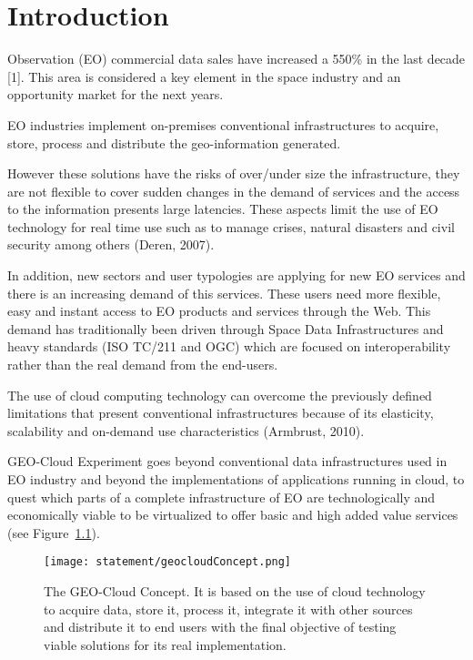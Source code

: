 \chapter{Introduction}

 Observation (\acs{EO}) commercial data sales have increased a 550\% in
the last decade \cite{sousa}[1]. This area is considered a key element in the
space industry and an opportunity market for the next years.

\ac{EO} industries implement on-premises conventional infrastructures to acquire,
store, process and distribute the geo-information generated.

However these solutions have the risks of over/under size the infrastructure, they are not flexible to cover sudden changes in the demand of services and the access to the information presents large latencies.  These aspects limit the use of \ac{EO} technology for real time use such as to manage crises, natural disasters and civil security among others (Deren, 2007).

In addition, new sectors and user typologies are applying for new \ac{EO} services
and there is an increasing demand of this services. These users
need more flexible, easy and instant access to \ac{EO} products and services through
the Web. This demand has traditionally been driven through Space Data
Infrastructures and heavy standards (\acs{ISO} TC/211 and \ac{OGC}) which are focused on
interoperability rather than the real demand from the end-users.

The use of cloud computing technology can overcome the previously defined limitations that present conventional infrastructures because of its elasticity, scalability and on-demand use characteristics (Armbrust, 2010).

GEO-Cloud Experiment goes beyond conventional data infrastructures used in \ac{EO}
industry and beyond the implementations of applications running in cloud, to
quest which parts of a complete infrastructure of \ac{EO} are technologically and
economically viable to be virtualized to offer basic and high added value
services (see Figure~\ref{fig:intr-geocloudConcept}).

\begin{figure}[!h]
\begin{center}
\texttt{[image: statement/geocloudConcept.png]}
\caption[The GEO-Cloud Concept.]{The GEO-Cloud Concept. It is based on the use of cloud technology to acquire data, store it, process it, integrate it with other sources and distribute it to end users with the final objective of testing viable solutions for its real implementation.}
\label{fig:intr-geocloudConcept}
\end{center}
\end{figure}

